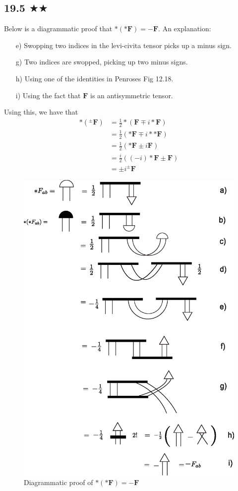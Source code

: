 

\subsection{19.5 $\bigstar \bigstar$}
Below is a diagrammatic proof that $*(*\mathbf{F})=-\mathbf{F}$. An explanation:
\begin{itemize}
\item[e)] Swopping two indices in the levi-civita tensor picks up a minus sign.
\item[g)] Two indices are swopped, picking up two minus signs.
\item[h)] Using one of the identities in Penroses Fig 12.18.
\item[i)] Using the fact that $\mathbf{F}$ is an antisymmetric tensor.
\end{itemize}
Using this, we have that
\begin{align*}
*(^\pm \mathbf{F})&=\frac{1}{2}*(\mathbf{F}\mp i*\mathbf{F})\\
&=\frac{1}{2}(*\mathbf{F}\mp i**\mathbf{F})\\
&=\frac{1}{2}(*\mathbf{F}\pm i\mathbf{F})\\
&=\frac{i}{2}((-i)*\mathbf{F}\pm \mathbf{F})\\
&=\pm i^\pm \mathbf{F}
\end{align*}
\begin{figure}\label{e}
\includegraphics[scale=0.7]{chapters/images/19.5.eps}
\caption{Diagrammatic proof of $*(*\mathbf{F})=-\mathbf{F}$ }
\end{figure} 
